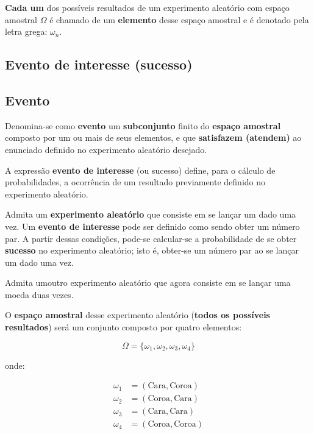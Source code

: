 \documentclass[
]{book}
\begin{document}
\textbf{Cada um} dos possíveis resultados de um experimento aleatório com espaço amostral \(\Omega\) é chamado de um \textbf{elemento} desse espaço amostral e é denotado pela letra grega: \(\omega_{n}\).

\hypertarget{evento-de-interesse-sucesso}{%
\subsection{Evento de interesse (sucesso)}\label{evento-de-interesse-sucesso}}

\hypertarget{evento}{%
\subsection{Evento}\label{evento}}

Denomina-se como \textbf{evento} um \textbf{subconjunto} finito do \textbf{espaço amostral} composto por um ou mais de seus elementos, e que \textbf{satisfazem (atendem)} ao enunciado definido no experimento aleatório desejado.

A expressão \textbf{evento de interesse} (ou sucesso) define, para o cálculo de probabilidades, a ocorrência de um resultado previamente definido no experimento aleatório.

Admita um \textbf{experimento aleatório} que consiste em se lançar um dado uma vez. Um \textbf{evento de interesse} pode ser definido como sendo obter um número par. A partir dessas condições, pode-se calcular-se a probabilidade de se obter \textbf{sucesso} no experimento aleatório; isto é, obter-se um número par ao se lançar um dado uma vez.

Admita umoutro experimento aleatório que agora consiste em se lançar uma moeda duas vezes.

O \textbf{espaço amostral} desse experimento aleatório (\textbf{todos os possíveis resultados}) será um conjunto composto por quatro elementos:

\[
\Omega = \{\omega_{1}, \omega_{2}, \omega_{3}, \omega_{4}\}
\]

onde:

\begin{align*}
\omega_{1} & = (\text{Cara}, \text{Coroa})\\
\omega_{2} & = (\text{Coroa}, \text{Cara})\\
\omega_{3} & = (\text{Cara}, \text{Cara}) \\
\omega_{4} & = (\text{Coroa}, \text{Coroa})
\end{align*}
\end{document}
